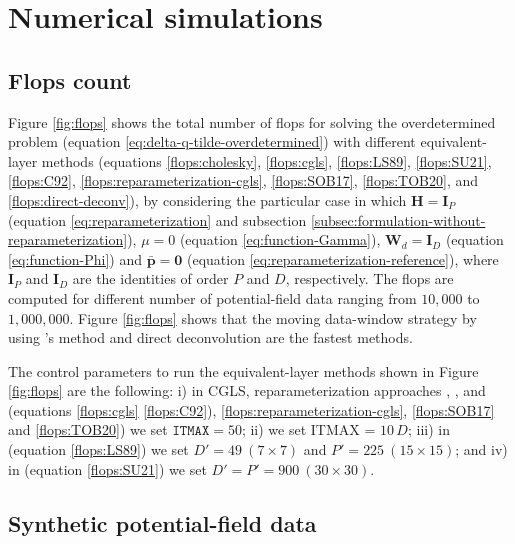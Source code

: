 \section{Numerical simulations}
\label{sec:numerical-simulations}

\subsection{Flops count}
\label{subsec:flops-count}

Figure \ref{fig:flops} shows the total number of flops for solving the overdetermined problem
(equation \ref{eq:delta-q-tilde-overdetermined}) with different equivalent-layer methods
(equations \ref{flops:cholesky}, \ref{flops:cgls}, \ref{flops:LS89}, \ref{flops:SU21}, 
\ref{flops:C92}, \ref{flops:reparameterization-cgls}, \ref{flops:SOB17}, \ref{flops:TOB20},
and \ref{flops:direct-deconv}), by considering 
the particular case in which $\mathbf{H} = \mathbf{I}_{P}$ (equation \ref{eq:reparameterization} and 
subsection \ref{subsec:formulation-without-reparameterization}),
$\mu = 0$ (equation \ref{eq:function-Gamma}), 
$\mathbf{W}_{d} = \mathbf{I}_{D}$ (equation \ref{eq:function-Phi}) and
$\bar{\mathbf{p}} = \mathbf{0}$ (equation \ref{eq:reparameterization-reference}), 
where $\mathbf{I}_{P}$ and $\mathbf{I}_{D}$ are the identities of order $P$ and $D$, respectively.
The flops are computed for different number of potential-field data ranging from $10,000$ to $1,000,000$.
Figure \ref{fig:flops} shows that the moving data-window strategy by using 
\citeauthor{leao-silva1989}'s \citeyear{leao-silva1989} method and direct deconvolution are the fastest methods.

The control parameters to run the equivalent-layer methods shown in Figure 
 \ref{fig:flops}  are the following: 
i) in CGLS, reparameterization approaches \cite[e.g.,][]{oliveirajr-etal2013, mendonca2020}, \cite{siqueira-etal2017}, and 
\cite{takahashi-etal2020} (equations \ref{flops:cgls} \ref{flops:C92}), 
\ref{flops:reparameterization-cgls},  \ref{flops:SOB17} and \ref{flops:TOB20}) we set $\mathtt{ITMAX} = 50$; 
ii) \cite{cordell1992} we set ITMAX = $10 \, D$; 
iii) in \cite{leao-silva1989} (equation \ref{flops:LS89}) we set 
$D'= 49 \: (7 \times 7)$ and $P' = 225 \: (15 \times 15) $; and
iv) in \cite{soler-uieda2021} (equation  \ref{flops:SU21}) we set 
$D'= P' = 900 \: (30 \times 30)$.

\subsection{Synthetic potential-field data}
\label{subsec:synthetic-data}

